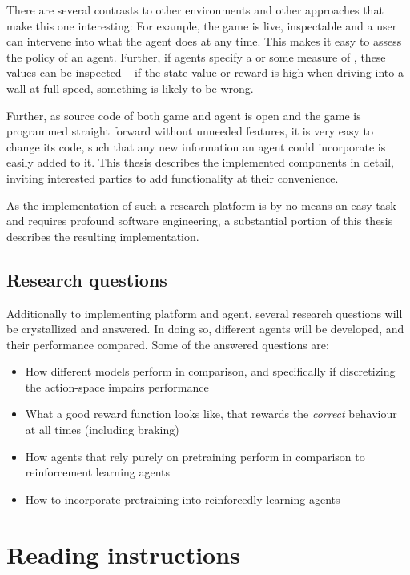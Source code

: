 There are several contrasts to other environments and other approaches that make this one interesting: For example, the game is live, inspectable and a user can intervene into what the agent does at any time. This makes it easy to assess the policy of an agent. Further, if agents specify a  or some measure of , these values can be inspected -- if the state-value or reward is high when driving into a wall at full speed, something is likely to be wrong.

Further, as source code of both game and agent is open and the game is programmed straight forward without unneeded features, it is very easy to change its code, such that any new information an agent could incorporate is easily added to it. This thesis describes the implemented components in detail, inviting interested parties to add functionality at their convenience.

As the implementation of such a research platform is by no means an easy task and requires profound software engineering, a substantial portion of this thesis describes the resulting implementation.

\subsection{Research questions}

\label{sec:researchquestions}

Additionally to implementing platform and agent, several research questions will be crystallized and answered. In doing so, different agents will be developed, and their performance compared. Some of the answered questions are:
\begin{itemize}
	\item How different models perform in comparison, and specifically if discretizing the action-space impairs performance
	\item What a good reward function looks like, that rewards the \textit{correct} behaviour at all times (including braking)
	\item How agents that rely purely on pretraining perform in comparison to reinforcement learning agents
	\item How to incorporate pretraining into reinforcedly learning agents
\end{itemize}

\section{Reading instructions}

